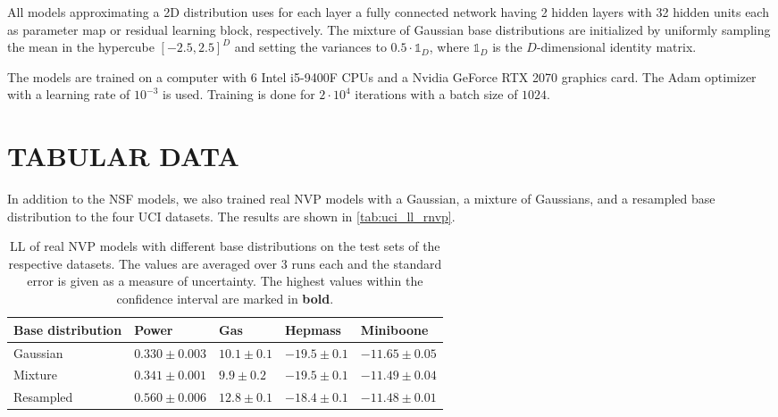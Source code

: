 \documentclass[twoside]{article}
\begin{document}
All models approximating a 2D distribution uses for each layer a fully connected network having 2 hidden layers with 32 hidden units each as parameter map or residual learning block, respectively. The mixture of Gaussian base distributions are initialized by uniformly sampling the mean in the hypercube $[-2.5, 2.5]^D$ and setting the variances to $0.5 \cdot \mathds{1}_D$, where $\mathds{1}_D$ is the $D$-dimensional identity matrix.

The models are trained on a computer with 6 Intel i5-9400F CPUs and a Nvidia GeForce RTX 2070 graphics card. The Adam optimizer with a learning rate of $10^{-3}$ is used. Training is done for $2\cdot10^4$ iterations with a batch size of $1024$.




\section{TABULAR DATA}
\label{sec:tab_app}

In addition to the NSF models, we also trained real NVP models with a Gaussian, a mixture of Gaussians, and a resampled base distribution to the four UCI datasets. The results are shown in \autoref{tab:uci_ll_rnvp}.

\begin{table*}[h]
  \caption{LL of real NVP models with different base distributions on the test sets of the respective datasets. The values are averaged over 3 runs each and the standard error is given as a measure of uncertainty. The highest values within the confidence interval are marked in \textbf{bold}.}
  \label{tab:uci_ll_rnvp}
  \centering
  \vspace{0.3cm}
  \begin{tabular}{l|llll}
    Base distribution & Power & Gas & Hepmass & Miniboone \\
    \hline
    Gaussian & $0.330\pm0.003$ & $10.1\pm0.1$ & $-19.5\pm0.1$ & $-11.65\pm0.05$ \\
    Mixture & $0.341\pm0.001$ & $9.9\pm0.2$ & $-19.5\pm0.1$ & $\mathbf{-11.49\pm0.04}$ \\
    Resampled & $\mathbf{0.560\pm0.006}$ & $\mathbf{12.8\pm0.1}$ & $\mathbf{-18.4\pm0.1}$ & $\mathbf{-11.48\pm0.01}$
  \end{tabular}
\end{table*}
\end{document}
